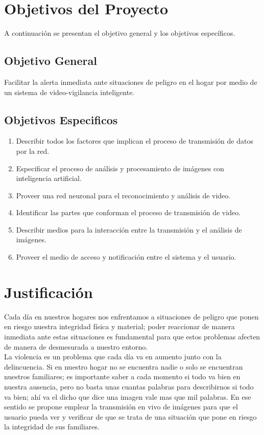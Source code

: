 \section{Objetivos del Proyecto}
A continuación se presentan el objetivo general y los objetivos específicos.

\subsection{Objetivo General}
Facilitar la alerta inmediata ante situaciones de peligro en el hogar por medio de un sistema de video-vigilancia inteligente.

\subsection{Objetivos Especificos}
\begin{enumerate}
    \item Describir todos los factores que implican el proceso de transmisión de datos por la red.
    \item Especificar el proceso de análisis y procesamiento de imágenes con inteligencia artificial.
    \item Proveer una red neuronal para el reconocimiento y análisis de video.
    \item Identificar las partes que conforman el proceso de transmisión de video.
    \item Describir medios para la interacción entre la transmisión y el análisis de imágenes.
    \item Proveer el medio de acceso y notificación entre el sistema y el usuario.
\end{enumerate}

\section{Justificación}
Cada día en nuestros hogares nos enfrentamos a situaciones de peligro que ponen en riesgo nuestra integridad física y material; poder reaccionar de manera inmediata ante estas situaciones es fundamental para que estos problemas afecten de manera de desmesurada a nuestro entorno.\\

La violencia es un problema que cada día va en aumento junto con la delincuencia. Si en nuestro hogar no se encuentra nadie o solo se encuentran nuestros familiares; es importante saber a cada momento si todo va bien en nuestra ausencia, pero no basta unas cuantas palabras para describirnos 
si todo va bien; ahí va el dicho que dice una imagen vale mas que mil palabras. En ese sentido se propone emplear la transmisión en vivo de imágenes para que el usuario pueda ver y verificar de que se trata de una situación que pone en riesgo la integridad de sus familiares.

